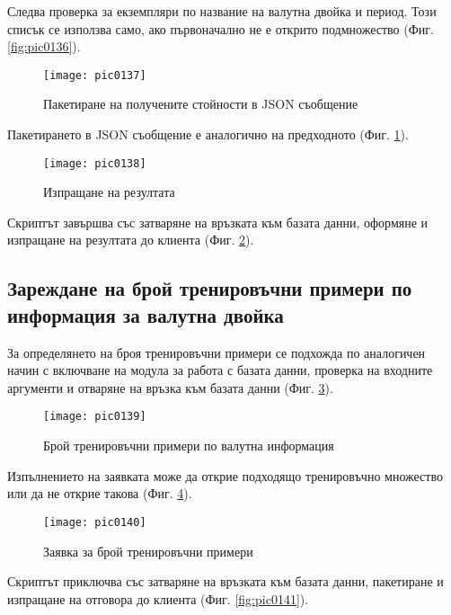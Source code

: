 Следва проверка за екземпляри по название на валутна двойка и период. Този списък се използва само, ако първоначално не е открито подмножество (Фиг. \ref{fig:pic0136}).

\begin{figure}[h]
  \centering
  \texttt{[image: pic0137]}
  \caption{Пакетиране на получените стойности в JSON съобщение}
\label{fig:pic0137}
\end{figure}
\FloatBarrier

Пакетирането в JSON съобщение е аналогично на предходното (Фиг. \ref{fig:pic0137}).

\begin{figure}[h]
  \centering
  \texttt{[image: pic0138]}
  \caption{Изпращане на резултата}
\label{fig:pic0138}
\end{figure}
\FloatBarrier

Скриптът завършва със затваряне на връзката към базата данни, оформяне и изпращане на резултата до клиента (Фиг. \ref{fig:pic0138}).

\subsection{Зареждане на брой тренировъчни примери по информация за валутна двойка}

За определянето на броя тренировъчни примери се подхожда по аналогичен начин с включване на модула за работа с базата данни, проверка на входните аргументи и отваряне на връзка към базата данни (Фиг. \ref{fig:pic0139}). 

\begin{figure}[h]
  \centering
  \texttt{[image: pic0139]}
  \caption{Брой тренировъчни примери по валутна информация}
\label{fig:pic0139}
\end{figure}
\FloatBarrier

Изпълнението на заявката може да открие подходящо тренировъчно множество или да не открие такова (Фиг. \ref{fig:pic0140}). 

\begin{figure}[h]
  \centering
  \texttt{[image: pic0140]}
  \caption{Заявка за брой тренировъчни примери}
\label{fig:pic0140}
\end{figure}
\FloatBarrier

Скриптът приключва със затваряне на връзката към базата данни, пакетиране и изпращане на отговора до клиента (Фиг. \ref{fig:pic0141}).

